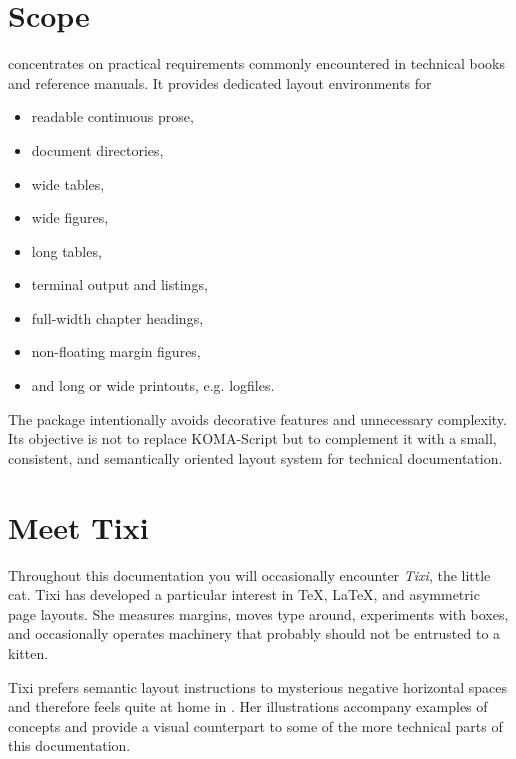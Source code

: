 \documentclass[
11pt,
a4paper,
oneside
]{scrbook}
\begin{document}
\section{Scope}

\mdlayout{} concentrates on practical requirements commonly encountered
in technical books and reference manuals.
It provides dedicated layout environments for
\begin{itemize}
	\item readable continuous prose,
	\item document directories,
	\item wide tables,
	\item wide figures,
	\item long tables,
	\item terminal output and listings,
	\item full-width chapter headings,
	\item non-floating margin figures,
	\item and long or wide printouts, e.g. logfiles.
\end{itemize}
The package intentionally avoids decorative features and unnecessary
complexity.
Its objective is not to replace KOMA-Script but to complement it with a small,
consistent, and semantically oriented layout system for technical
documentation.

\section{Meet Tixi}

\begin{SynchronizedMarginAndTextArea}
	\begin{TextInMarginArea}
	\end{TextInMarginArea}
	\begin{TextInTextArea}
		Throughout this documentation you will occasionally encounter
		\emph{Tixi}, the little \mdlayout{} cat.
		Tixi has developed a particular interest in \TeX{}, \LaTeX{}, and
		asymmetric page layouts. She measures margins, moves type around,
		experiments with boxes, and occasionally operates machinery that
		probably should not be entrusted to a kitten.
		
		Tixi prefers semantic layout instructions to mysterious negative
		horizontal spaces and therefore feels quite at home in \mdlayout{}.
		Her illustrations accompany examples of \mdlayout{} concepts and
		provide a visual counterpart to some of the more technical parts of
		this documentation.
	\end{TextInTextArea}
\end{SynchronizedMarginAndTextArea}
\end{document}
